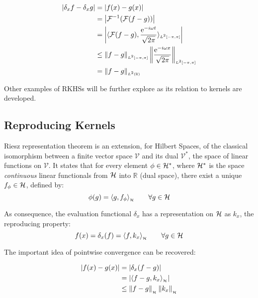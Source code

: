 \begin{subequations}
\begin{align}
\left|\delta_x f-\delta_x g\right| &= \left|f(x)-g(x)\right|\\
			  &=\left| \mathcal{F}^{-1}(\mathcal{F}(f-g)) \right|\\
			  &=\left| \langle \mathcal{F}(f-g),\frac{\mathrm{e}^{-i\omega
			  t}}{\sqrt{2\pi}}\rangle_{\scriptscriptstyle L^2[-\pi,\pi]} \right| \label{eq:cont_four}
			  \\
			  &\leq
			  \left\lVert f-g\right\rVert_{\scriptscriptstyle
			  L^2[-\pi,\pi]}\left\lVert\frac{\mathrm{e}^{-i\omega x}}{\sqrt{2\pi}}\right\rVert_{\scriptscriptstyle L^2[-\pi,\pi]} \label{eq:cont_cs} \\
			  &= \left\lVert f-g\right\rVert_{\scriptscriptstyle L^2(\mathbb{R})} \label{eq:cont_par}
\end{align}
\end{subequations}

Other examples of RKHSs will be further explore as its relation to kernels are
developed.

\subsection{Reproducing Kernels}

Riesz representation theorem is an extension, for Hilbert Spaces, of the
classical isomorphism between a finite vector space $\mathcal{V}$ and its dual
$\mathcal{V}^*$, the space of linear functions on $\mathcal{V}$. It states that
for every element $\phi \in \mathcal{H}^*$, where $\mathcal{H}^*$ is the space
\textit{continuous} linear functionals from $\mathcal{H}$ into $\mathbb{R}$ (dual
space), there exist a unique $f_\phi \in \mathcal{H}$, defined by:
\begin{equation*}
\phi(g)= \langle g,f_\phi\rangle_{_{\mathcal{H}}}\qquad \forall g \in \mathcal{H}
\end{equation*}

As consequence, the evaluation functional \(\delta_x\) has a representation on
\(\mathcal{H}\) as \(k_x\), the reproducing property:
\begin{equation*}
f(x) = \delta_x(f) = \langle f,k_x\rangle_{_{\mathcal{H}}}\qquad \forall g \in \mathcal{H}
\end{equation*}

The important idea of pointwise convergence can be recovered:

\begin{subequations}
\begin{align}
\left|f(x)-g(x)\right| &= \left|\delta_x(f-g)\right|\\
			  &= \left|\langle f-g,k_x\rangle_{_{\mathcal{H}}}\right|\\
			  &\leq \left\lVert f-g\right\rVert_{_{\mathcal{H}}}\left\lVert k_x\right\rVert_{_{\mathcal{H}}}\label{eq:pw_cs_ineq}
\end{align}
\end{subequations}

